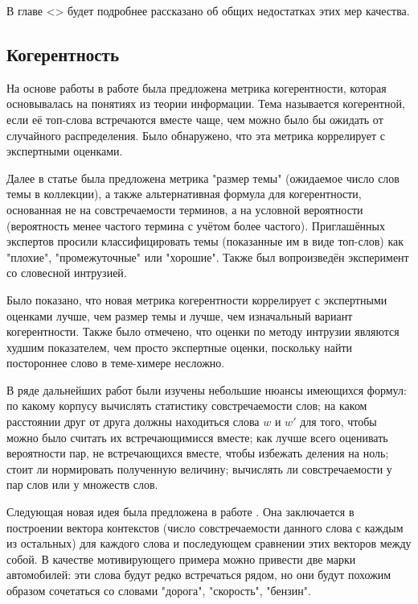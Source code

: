 В главе <> будет подробнее рассказано об общих недостатках этих мер качества.



\subsection{Когерентность}
На основе работы \cite{rtl} в работе \cite{mrtl} была предложена метрика когерентности, которая основывалась на понятиях из теории информации. Тема называется когерентной, если её топ-слова встречаются вместе чаще, чем можно было бы ожидать от случайного распределения. Было обнаружено, что эта метрика коррелирует с экспертными оценками.

Далее в статье \cite{mimno2011} была предложена метрика "размер темы" (ожидаемое число слов темы в коллекции), а также альтернативная формула для когерентности, основанная не на совстречаемости терминов, а на условной вероятности (вероятность менее частого термина с учётом более частого). Приглашённых экспертов просили классифицировать темы (показанные им в виде топ-слов) как "плохие", "промежуточные" или "хорошие". Также был вопроизведён эксперимент со словесной интрузией. 

Было показано, что новая метрика когерентности коррелирует с экспертными оценками лучше, чем размер темы и лучше, чем изначальный вариант когерентности. Также было отмечено, что оценки по методу интрузии являются худшим показателем, чем просто экспертные оценки, поскольку найти постороннее слово в теме-химере несложно.

В ряде дальнейших работ были изучены небольшие нюансы имеющихся формул: по какому корпусу вычислять статистику совстречаемости слов; на каком расстоянии друг от друга должны находиться слова $w$ и $w'$ для того, чтобы можно было считать их встречающимисся вместе; как лучше всего оценивать вероятности пар, не встречающихся вместе, чтобы избежать деления на ноль; стоит ли нормировать полученную величину; вычислять ли совстречаемости у пар слов или у множеств слов.

Следующая новая идея была предложена в работе \cite{aletras2013evaluating}. Она заключается в построении вектора контекстов (число совстречаемости данного слова с каждым из остальных) для каждого слова и последующем сравнении этих векторов между собой. В качестве мотивирующего примера можно привести две марки автомобилей: эти слова будут редко встречаться рядом, но они будут похожим образом сочетаться со словами "дорога", "скорость", "бензин".

